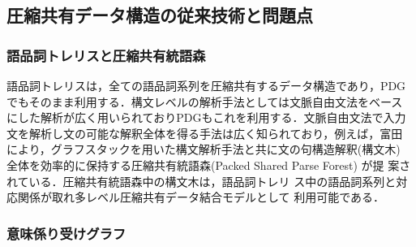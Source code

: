 \begin{comment}
\subsection{句構造と依存構造の併用}
文解析を精度良く行なうためには様々な知識を利用する必要がある．従来，文
の構造を記述する代表的枠組みとして句構造と依存構造がある．句構造は，品
詞への抽象化により語や句の順序に関する知識の記述に優れており，依存構造
は語の間の種々の依存関係に関する知識の記述に優れている．それぞれの表現
レベルでの制約知識・選好知識の記述を自然な形で可能とするため，PDGでは，
句構造形式の共有データ構造(ヘッド付き統語森)と依存構造形式の共有データ
構造(依存森)をそれぞれ関連付けて組み込んでいる．これは句構造(C-構造)と
機能構造(F-構造)という２つの構文レベルの表現を持つLFG\cite{Kaplan89}に
おいて，SUBJECT,OBJECTなど構文的機能に関する制約がF-構造で記述され，文
法の記述性を高めているのと類似している\footnote{LFGでは，１つの文解釈
であるC-構造とそれから作られるF-構造の制約関係などを規定しているが，文
に対する可能なC-構造全体とF-構造全体の扱いについては，特に規定していな
い点がPDGとの基本的違いである．}．なお，Early法，Chart法といった文脈自
由文法の解析アルゴリズムを用いて依存文法を直接解析して依存構造を求める
手法も提案されている\cite{Mertens02} が，句構造を作らない点で本手法と
は異なっている．
\end{comment}

\subsection{圧縮共有データ構造の従来技術と問題点}

\subsubsection{語品詞トレリスと圧縮共有統語森}

語品詞トレリスは，全ての語品詞系列を圧縮共有するデータ構造であり，PDG 
でもそのまま利用する．構文レベルの解析手法としては文脈自由文法をベース
にした解析が広く用いられておりPDGもこれを利用する．文脈自由文法で入力
文を解析し文の可能な解釈全体を得る手法は広く知られており，例えば，富田
により，グラフスタックを用いた構文解析手法と共に文の句構造解釈(構文木)
全体を効率的に保持する圧縮共有統語森(Packed Shared Parse Forest) が提
案されている\cite{Tomita87}．圧縮共有統語森中の構文木は，語品詞トレリ
ス中の語品詞系列と対応関係が取れ多レベル圧縮共有データ結合モデルとして
利用可能である．

\subsubsection{意味係り受けグラフ}

